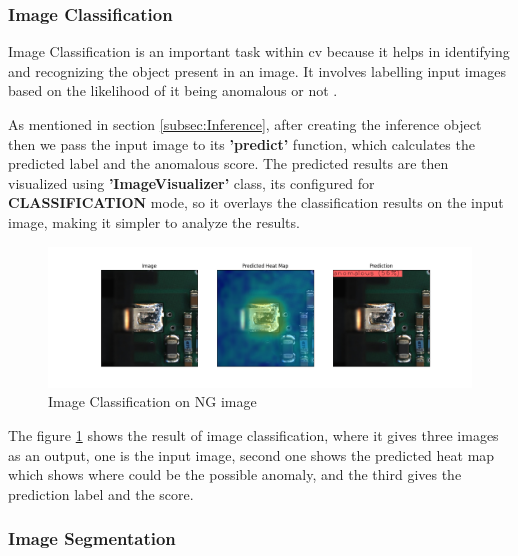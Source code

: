 \subsubsection{Image Classification}
\label{subsec:Image Classification}

Image Classification is an important task within \gls{cv} because it helps in identifying and recognizing the object present in an image. It involves labelling input images based on the likelihood of it being anomalous or not \cite{FANG2020100980}.

As mentioned in section \ref{subsec:Inference}, after creating the inference object then we pass the input image to its \textbf{'predict'} function, which calculates the predicted label and the anomalous score. The predicted results are then visualized using \textbf{'ImageVisualizer'} class, its configured for \textbf{CLASSIFICATION} mode, so it overlays the classification results on the input image, making it simpler to analyze the results.

\begin{figure}[ht!]
    \centering
    \includegraphics[width=1\linewidth]{Images/anomalous_image_classification.jpg}
    \caption{Image Classification on NG image}
    \label{fig:Image classification on NG image}
\end{figure}

The figure \ref{fig:Image classification on NG image} shows the result of image classification, where it gives three images as an output, one is the input image, second one shows the predicted heat map which shows where could be the possible anomaly, and the third gives the prediction label and the score.

\subsubsection{Image Segmentation}

